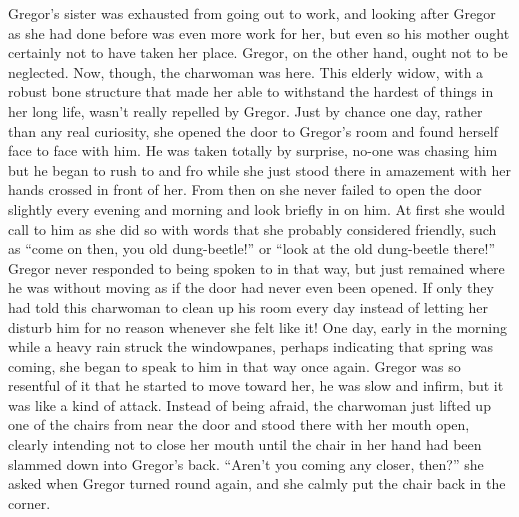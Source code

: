 \documentclass[12pt]{report}
\begin{document}
Gregor's sister was exhausted from going out to work, and looking after
Gregor as she had done before was even more work for her, but even so
his mother ought certainly not to have taken her place. Gregor, on the
other hand, ought not to be neglected. Now, though, the charwoman was
here. This elderly widow, with a robust bone structure that made her
able to withstand the hardest of things in her long life, wasn't really
repelled by Gregor. Just by chance one day, rather than any real
curiosity, she opened the door to Gregor's room and found herself face
to face with him. He was taken totally by surprise, no-one was chasing
him but he began to rush to and fro while she just stood there in
amazement with her hands crossed in front of her. From then on she never
failed to open the door slightly every evening and morning and look
briefly in on him. At first she would call to him as she did so with
words that she probably considered friendly, such as ``come on then, you
old dung-beetle!'' or ``look at the old dung-beetle there!'' Gregor
never responded to being spoken to in that way, but just remained where
he was without moving as if the door had never even been opened. If only
they had told this charwoman to clean up his room every day instead of
letting her disturb him for no reason whenever she felt like it! One
day, early in the morning while a heavy rain struck the windowpanes,
perhaps indicating that spring was coming, she began to speak to him in
that way once again. Gregor was so resentful of it that he started to
move toward her, he was slow and infirm, but it was like a kind of
attack. Instead of being afraid, the charwoman just lifted up one of the
chairs from near the door and stood there with her mouth open, clearly
intending not to close her mouth until the chair in her hand had been
slammed down into Gregor's back. ``Aren't you coming any closer,
then?'' she asked when Gregor turned round again, and she calmly put
the chair back in the corner.
\end{document}
